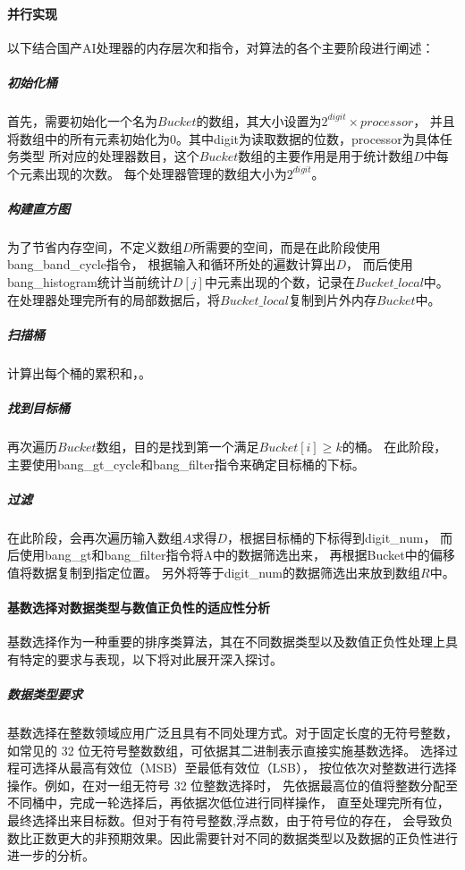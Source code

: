 \paragraph{并行实现}
以下结合国产AI处理器的内存层次和指令，对算法的各个主要阶段进行阐述：
\subparagraph{初始化桶}

首先，需要初始化一个名为\(Bucket\)的数组，其大小设置为\(2^{digit} \times processor\)，
并且将数组中的所有元素初始化为\(0\)。其中digit为读取数据的位数，processor为具体任务类型
所对应的处理器数目，这个\(Bucket\)数组的主要作用是用于统计数组\(D\)中每个元素出现的次数。
每个处理器管理的数组大小为\(2^{digit}\)。
\subparagraph{构建直方图}

为了节省内存空间，不定义数组\(D\)所需要的空间，而是在此阶段使用bang\_band\_cycle指令，
根据输入和循环所处的遍数计算出\(D\)，
而后使用bang\_histogram统计当前统计\(D[j]\)中元素出现的个数，记录在\(Bucket\_local\)中。
在处理器处理完所有的局部数据后，将\(Bucket\_local\)复制到片外内存\(Bucket\)中。

\subparagraph{扫描桶}

计算出每个桶的累积和，。

\subparagraph{找到目标桶}

再次遍历\(Bucket\)数组，目的是找到第一个满足\(Bucket[i] \geq k\)的桶。
在此阶段，主要使用bang\_gt\_cycle和bang\_filter指令来确定目标桶的下标。

\subparagraph{过滤}

在此阶段，会再次遍历输入数组\(A\)求得\(D\)，根据目标桶的下标得到digit\_num，
而后使用bang\_gt和bang\_filter指令将A中的数据筛选出来，
再根据Bucket中的偏移值将数据复制到指定位置。
另外将等于digit\_num的数据筛选出来放到数组\(R\)中。


\paragraph{基数选择对数据类型与数值正负性的适应性分析}


基数选择作为一种重要的排序类算法，其在不同数据类型以及数值正负性处理上具有特定的要求与表现，以下将对此展开深入探讨。

\subparagraph{数据类型要求}

基数选择在整数领域应用广泛且具有不同处理方式。对于固定长度的无符号整数，
如常见的 32 位无符号整数数组，可依据其二进制表示直接实施基数选择。
选择过程可选择从最高有效位（MSB）至最低有效位（LSB），
按位依次对整数进行选择操作。例如，在对一组无符号 32 位整数选择时，
先依据最高位的值将整数分配至不同桶中，完成一轮选择后，再依据次低位进行同样操作，
直至处理完所有位，最终选择出来目标数。但对于有符号整数,浮点数，由于符号位的存在，
会导致负数比正数更大的非预期效果。因此需要针对不同的数据类型以及数据的正负性进行
进一步的分析。

